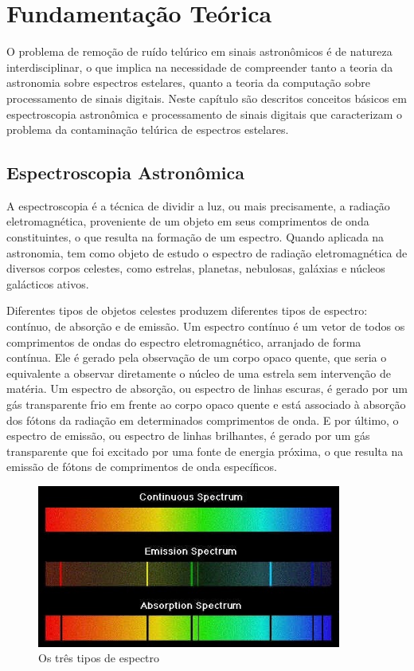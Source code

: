 \chapter{Fundamentação Teórica}
\label{cap:fundamentacao-teorica}

O problema de remoção de ruído telúrico em sinais astronômicos é de natureza interdisciplinar, o que implica na necessidade de compreender tanto a teoria da astronomia sobre espectros estelares, quanto a teoria da computação sobre processamento de sinais digitais.
Neste capítulo são descritos conceitos básicos em espectroscopia astronômica e processamento de sinais digitais que caracterizam o problema da contaminação telúrica de espectros estelares.

\section{Espectroscopia Astronômica}

A espectroscopia é a técnica de dividir a luz, ou mais precisamente, a radiação eletromagnética, proveniente de um objeto em seus comprimentos de onda constituintes, o que resulta na formação de um espectro. Quando aplicada na astronomia, tem como objeto de estudo o espectro de radiação eletromagnética de diversos corpos celestes, como estrelas, planetas, nebulosas, galáxias e núcleos galácticos ativos.

Diferentes tipos de objetos celestes produzem diferentes tipos de espectro:  contínuo, de absorção e de emissão. Um espectro contínuo é um vetor de todos os comprimentos de ondas do espectro eletromagnético, arranjado de forma contínua. Ele é gerado pela observação de um corpo opaco quente, que seria o equivalente a observar diretamente o núcleo de uma estrela sem intervenção de matéria. Um espectro de absorção, ou espectro de linhas escuras, é gerado por um gás transparente frio em frente ao corpo opaco quente e está associado à absorção dos fótons da radiação em determinados comprimentos de onda. E por último, o espectro de emissão, ou espectro de linhas brilhantes, é gerado por um gás transparente que foi excitado por uma fonte de energia próxima, o que resulta na emissão de fótons de comprimentos de onda específicos. 

\begin{figure}[htb]
\centering
\includegraphics[width=10cm]{figuras/spectypes.jpg}
\caption{Os três tipos de espectro}
\label{fig:spectrum-types}
\end{figure}


